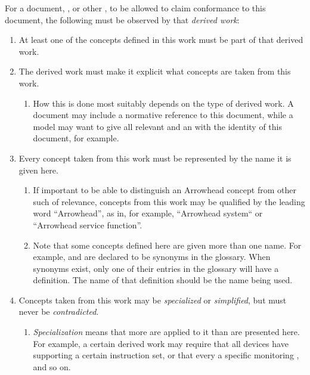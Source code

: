 %
%

For a document, , or other , to be allowed to claim conformance to this document, the following must be observed by that \textit{derived work}:

\begin{enumerate}
\item At least one of the concepts defined in this work must be part of that derived work.
\item The derived work must make it explicit what concepts are taken from this work.
	\begin{enumerate}
	\item How this is done most suitably depends on the type of derived work. A document may include a normative reference to this document, while a model may want to give all relevant  and  an  with the identity of this document, for example.
	\end{enumerate}
\item Every concept taken from this work must be represented by the name it is given here.
	\begin{enumerate}
	\item If important to be able to distinguish an Arrowhead concept from other such of relevance, concepts from this work may be qualified by the leading word ``Arrowhead'', as in, for example, ``Arrowhead system`` or ``Arrowhead service function''.
	\item Note that some concepts defined here are given more than one name. For example,  and  are declared to be synonyms in the glossary. When synonyms exist, only one of their entries in the glossary will have a definition. The name of that definition should be the name being used.
	\end{enumerate}
\item Concepts taken from this work may be \textit{specialized} or \textit{simplified}, but must never be \textit{contradicted}.
	\begin{enumerate}
	\item \textit{Specialization} means that more  are applied to it than are presented here. For example, a certain derived work may require that all devices have  supporting a certain instruction set, or that every   a specific monitoring , and so on.

\end{enumerate}
\end{enumerate}
